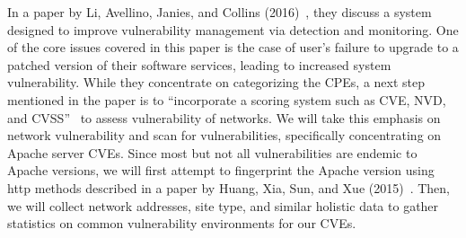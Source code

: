 In a paper by Li, Avellino, Janies, and Collins (2016)~\cite{li_avellino_janies_collins_2016}, they discuss a system designed to improve vulnerability management via detection and monitoring. One of the core issues covered in this paper is the case of user's failure to upgrade to a patched version of their software services, leading to increased system vulnerability. While they concentrate on categorizing the CPEs, a next step mentioned in the paper is to ``incorporate a scoring system such as CVE, NVD, and CVSS''~\cite{li_avellino_janies_collins_2016} to assess vulnerability of networks. We will take this emphasis on network vulnerability and scan for vulnerabilities, specifically concentrating on Apache server CVEs. Since most but not all vulnerabilities are endemic to Apache versions, we will first attempt to fingerprint the Apache version using http methods described in a paper by Huang, Xia, Sun, and Xue (2015)~\cite{huang_xia_sun_xue_2015}. Then, we will collect network addresses, site type, and similar holistic data to gather statistics on common vulnerability environments for our CVEs.